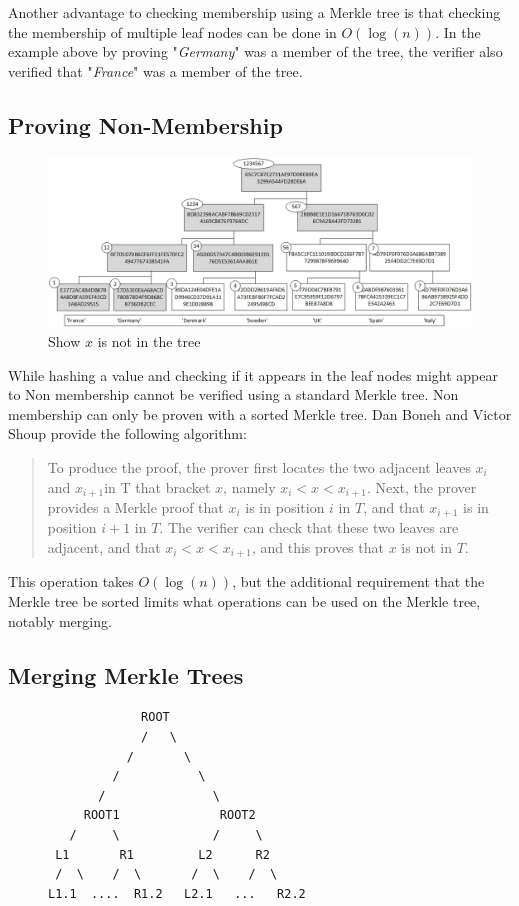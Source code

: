 \documentclass[12pt]{article}
\begin{document}
Another advantage to checking membership using a Merkle tree is that checking the membership of multiple leaf nodes can be done in $O(\log(n))$. In the example above by proving "\emph{Germany}" was a member of the tree, the verifier also verified that "\emph{France}" was a member of the tree.

\subsection{Proving Non-Membership}

	\begin{figure}[H]
		\centering
	\includegraphics[width=.8\textwidth]{../Images/merkle-example.png}
	\caption{Show $x$ is not in the tree\cite{boneh2020graduate}}
\end{figure}

While hashing a value and checking if it appears in the leaf nodes might appear to Non membership cannot be verified using a standard Merkle tree. Non membership can only be proven with a sorted Merkle tree.  Dan Boneh and Victor Shoup provide the following  algorithm:
\begin{quote}
	To produce the proof, the prover first locates the two adjacent leaves $x_i$ and $x_{i+1 }$in T that bracket $x$, namely $x_i < x < x_{i+1}$. Next, the prover provides a Merkle proof that $x_i$
	is in position $i$ in $T$, and that $x_{i+1}$ is in position $i + 1$ in $T$. The verifier can check that these two leaves
	are adjacent, and that $x_i < x < x_{i+1}$, and this proves that $x$ is not in $T$. 
	\end{quote}
	
This operation takes $O(\log(n))$, but the additional requirement that the Merkle tree be sorted limits what operations can be used on the Merkle tree, notably merging.

\subsection{Merging Merkle Trees}

\begin{figure}[H]
    \begin{center}
	\begin{verbatim}
             ROOT
             /   \
           /       \
         /           \
       /               \
     ROOT1              ROOT2
   /     \             /     \
 L1       R1         L2      R2
 /  \    /  \       /  \    /  \     
L1.1  ....  R1.2   L2.1   ...   R2.2
\end{verbatim}
 \end{center}
\end{figure}
\end{document}
